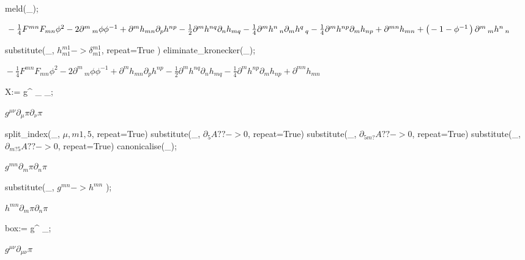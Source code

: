 \documentclass[12pt,a4paper,svgnames]{extarticle}
\newcommand\brwrap[3]{%
  \setbox0=\hbox{$#2$}
  \left#1\vbox to \the\ht0{\hbox to 0pt{}}\right.\kern-.2em
  \begingroup #2\endgroup\kern-.15em
  \left.\vbox to \the\ht0{\hbox to 0pt{}}\right#3
}
\begin{document}
\begin{python}
meld(_);
\end{python}
\begin{adjustwidth}{1em}{0cm}${} - \frac{1}{4}F^{m n} F_{m n} {\phi}^{2}-2\partial^{m}\,_{m}{\phi} {\phi}^{-1}+\partial^{m}{h_{m n}} \partial_{p}{h^{n p}} - \frac{1}{2}\partial^{m}{h^{n q}} \partial_{n}{h_{m q}} - \frac{1}{4}\partial^{m}{h^{n}\,_{n}} \partial_{m}{h^{q}\,_{q}} - \frac{1}{4}\partial^{m}{h^{n p}} \partial_{m}{h_{n p}}+\partial^{m n}{h_{m n}}+\brwrap{(}{-1-{\phi}^{-1}}{)} \partial^{m}\,_{m}{h^{n}\,_{n}}$\end{adjustwidth}
\begin{python}
substitute(_, $h^{m1}_{m1} -> \delta^{m1}_{m1}$, repeat=True )
eliminate_kronecker(_);
\end{python}
\begin{adjustwidth}{1em}{0cm}${} - \frac{1}{4}F^{m n} F_{m n} {\phi}^{2}-2\partial^{m}\,_{m}{\phi} {\phi}^{-1}+\partial^{m}{h_{m n}} \partial_{p}{h^{n p}} - \frac{1}{2}\partial^{m}{h^{n q}} \partial_{n}{h_{m q}} - \frac{1}{4}\partial^{m}{h^{n p}} \partial_{m}{h_{n p}}+\partial^{m n}{h_{m n}}$\end{adjustwidth}
\begin{python}
X:= g^{\mu \nu} \partial_{\mu}{\pi} \partial_{\nu}{\pi};
\end{python}
\begin{adjustwidth}{1em}{0cm}${}g^{\mu \nu} \partial_{\mu}{\pi} \partial_{\nu}{\pi}$\end{adjustwidth}
\begin{python}
split_index(_, $\mu, m1, 5$, repeat=True)
substitute(_, $\partial_{5}{A??} -> 0$, repeat=True)
substitute(_, $\partial_{5 m?}{A??} -> 0$, repeat=True)
substitute(_, $\partial_{m? 5}{A??} -> 0$, repeat=True)
canonicalise(_);
\end{python}
\begin{adjustwidth}{1em}{0cm}${}g^{m n} \partial_{m}{\pi} \partial_{n}{\pi}$\end{adjustwidth}
\begin{python}
substitute(_, $g^{m n} -> h^{m n}$ );
\end{python}
\begin{adjustwidth}{1em}{0cm}${}h^{m n} \partial_{m}{\pi} \partial_{n}{\pi}$\end{adjustwidth}
\begin{python}
box:= g^{\mu \nu} \partial_{\mu \nu}{\pi};
\end{python}
\begin{adjustwidth}{1em}{0cm}${}g^{\mu \nu} \partial_{\mu \nu}{\pi}$\end{adjustwidth}
\end{document}
